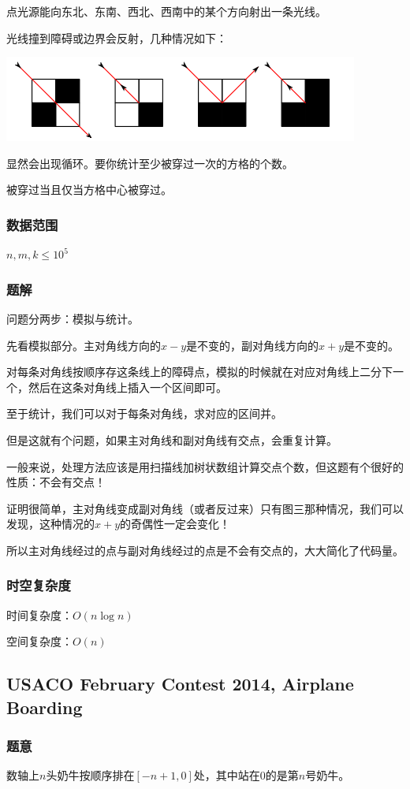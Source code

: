 \documentclass{ctexart}
\begin{document}
点光源能向东北、东南、西北、西南中的某个方向射出一条光线。

光线撞到障碍或边界会反射，几种情况如下：

\includegraphics{mirror.png}

显然会出现循环。要你统计至少被穿过一次的方格的个数。

被穿过当且仅当方格中心被穿过。
\subsubsection{数据范围}
$n,m,k \le 10^5$
\subsubsection{题解}
问题分两步：模拟与统计。

先看模拟部分。主对角线方向的$x-y$是不变的，副对角线方向的$x+y$是不变的。

对每条对角线按顺序存这条线上的障碍点，模拟的时候就在对应对角线上二分下一个，然后在这条对角线上插入一个区间即可。

至于统计，我们可以对于每条对角线，求对应的区间并。

但是这就有个问题，如果主对角线和副对角线有交点，会重复计算。

一般来说，处理方法应该是用扫描线加树状数组计算交点个数，但这题有个很好的性质：不会有交点！

证明很简单，主对角线变成副对角线（或者反过来）只有图三那种情况，我们可以发现，这种情况的$x+y$的奇偶性一定会变化！

所以主对角线经过的点与副对角线经过的点是不会有交点的，大大简化了代码量。
\subsubsection{时空复杂度}
时间复杂度：$O(n \log n)$

空间复杂度：$O(n)$
\subsection{USACO February Contest 2014, Airplane Boarding}
\subsubsection{题意}
数轴上$n$头奶牛按顺序排在$[-n+1,0]$处，其中站在$0$的是第$n$号奶牛。
\end{document}
